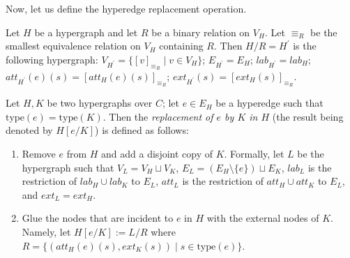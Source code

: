 \documentclass[a4paper,UKenglish,cleveref, autoref, thm-restate,pdfa]{lipics-v2021}
\newcommand{\eqdef}{:=}
\newcommand{\lab}{\mathit{lab}}
\newcommand{\att}{\mathit{att}}
\newcommand{\ext}{\mathit{ext}}
\newcommand{\type}{\mathrm{type}}
\begin{document}
Now, let us define the hyperedge replacement operation.
\begin{definition}
	Let $H$ be a hypergraph and let $R$ be a binary relation on $V_H$. Let $\equiv_R$ be the smallest equivalence relation on $V_H$ containing $R$. Then $H/R = H^\prime$ is the following hypergraph: $V_{H^\prime} = \{[v]_{\equiv_R} \mid v \in V_H\}$; $E_{H^\prime} = E_H$; $\lab_{H^\prime} = \lab_H$; $\att_{H^\prime}(e)(s) = [\att_{H}(e)(s)]_{\equiv_R}$; $\ext_{H^\prime}(s) = [\ext_{H}(s)]_{\equiv_R}$.
\end{definition}
\begin{definition}
	Let $H,K$ be two hypergraphs over $C$; let $e \in E_H$ be a hyperedge such that $\type(e) = \type(K)$. Then the \emph{replacement of $e$ by $K$ in $H$} (the result being denoted by $H[e/K]$) is defined as follows:
	\begin{enumerate}
		\item Remove $e$ from $H$ and add a disjoint copy of $K$. Formally, let $L$ be the hypergraph such that $V_L = V_H \sqcup V_K$, $E_L = (E_H \setminus \{e\}) \sqcup E_K$, $\lab_L$ is the restriction of $\lab_H \cup \lab_K$ to $E_L$, $\att_L$ is the restriction of $\att_H \cup \att_K$ to $E_L$, and $\ext_L = \ext_H$.
		\item Glue the nodes that are incident to $e$ in $H$ with the external nodes of $K$. Namely, let $H[e/K] \eqdef L/R$ where $R = \{(\att_H(e)(s),\ext_K(s)) \mid s \in \type(e)\}$.
	\end{enumerate}
\end{definition}
\end{document}
